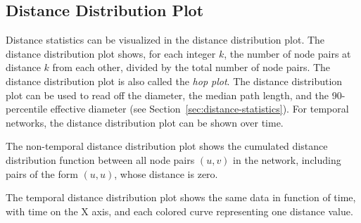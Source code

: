 \documentclass{article}
\begin{document}
\subsection{Distance Distribution Plot}
Distance statistics can be visualized in the distance distribution plot.
The distance distribution plot shows, for each integer $k$, the number
of node pairs at distance $k$ from each other, divided by the total
number of node pairs.  The distance distribution plot is also called the
\emph{hop plot}.  
The distance distribution plot can be used to
read off the diameter, the median path length, and the 90-percentile
effective diameter (see Section~\ref{sec:distance-statistics}).  For
temporal networks, the distance distribution plot can be shown over
time.

The non-temporal distance distribution plot shows the cumulated distance
distribution function between all node pairs $(u,v)$ in the network,
including pairs of the form $(u,u)$, whose distance is zero.

The temporal distance distribution plot shows the same data in function
of time, with time on the X axis, and each colored curve representing
one distance value.
\end{document}
